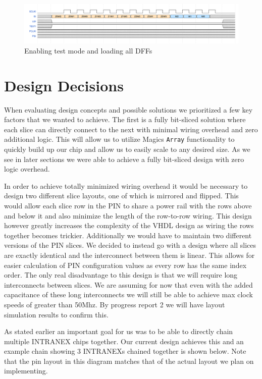 \begin{figure}[H]
    \centering
    \includegraphics[width=\linewidth]{../waveforms/test.png}
    \caption{Enabling test mode and loading all DFFs}
\end{figure}

\section{Design Decisions}

When evaluating design concepts and possible solutions we prioritized a few key
factors that we wanted to achieve. The first is a fully bit-sliced solution
where each slice can directly connect to the next with minimal wiring overhead
and zero additional logic. This will allow us to utilize Magics \texttt{Array}
functionality to quickly build up our chip and allow us to easily scale to any
desired size. As we see in later sections we were able to achieve a fully
bit-sliced design with zero logic overhead.

In order to achieve totally minimized wiring overhead it would be necessary to
design two different slice layouts, one of which is mirrored and flipped. This
would allow each slice row in the PIN to share a power rail with the rows above
and below it and also minimize the length of the row-to-row wiring. This design
however greatly increases the complexity of the VHDL design as wiring the rows
together becomes trickier. Additionally we would have to maintain two different
versions of the PIN slices. We decided to instead go with a design where all
slices are exactly identical and the interconnect between them is linear. This
allows for easier calculation of PIN configuration values as every row has the
same index order.  The only real disadvantage to this design is that we will
require long interconnects between slices. We are assuming for now that even
with the added capacitance of these long interconnects we will still be able to
achieve max clock speeds of greater than 50Mhz. By progress report 2 we will
have layout simulation results to confirm this.

As stated earlier an important goal for us was to be able to directly chain
multiple INTRANEX chips together. Our current design achieves this and an
example chain showing 3 INTRANEXs chained together is shown below. Note that
the pin layout in this diagram matches that of the actual layout we plan on
implementing.

